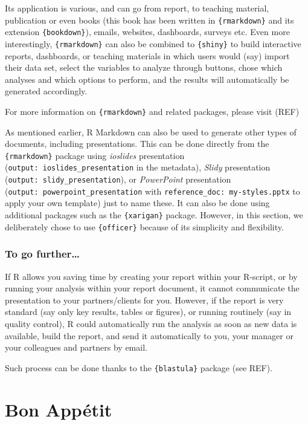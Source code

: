\documentclass[
]{book}
\begin{document}
Its application is various, and can go from report, to teaching material, publication or even books (this book has been written in \texttt{\{rmarkdown\}} and its extension \texttt{\{bookdown\}}), emails, websites, dashboards, surveys etc. Even more interestingly, \texttt{\{rmarkdown\}} can also be combined to \texttt{\{shiny\}} to build interactive reports, dashboards, or teaching materials in which users would (say) import their data set, select the variables to analyze through buttons, chose which analyses and which options to perform, and the results will automatically be generated accordingly.

For more information on \texttt{\{rmarkdown\}} and related packages, please visit (REF)

As mentioned earlier, R Markdown can also be used to generate other types of documents, including presentations. This can be done directly from the \texttt{\{rmarkdown\}} package using \emph{ioslides} presentation (\texttt{output:\ ioslides\_presentation} in the metadata), \emph{Slidy} presentation (\texttt{output:\ slidy\_presentation}), or \emph{PowerPoint} presentation (\texttt{output:\ powerpoint\_presentation} with \texttt{reference\_doc:\ my-styles.pptx} to apply your own template) just to name these. It can also be done using additional packages such as the \texttt{\{xarigan\}} package. However, in this section, we deliberately chose to use \texttt{\{officer\}} because of its simplicity and flexibility.

\hypertarget{to-go-further}{%
\section{To go further\ldots{}}\label{to-go-further}}

If R allows you saving time by creating your report within your R-script, or by running your analysis within your report document, it cannot communicate the presentation to your partners/clients for you. However, if the report is very standard (say only key results, tables or figures), or running routinely (say in quality control), R could automatically run the analysis as soon as new data is available, build the report, and send it automatically to you, your manager or your colleagues and partners by email.

Such process can be done thanks to the \texttt{\{blastula\}} package (see REF).

\hypertarget{part-bon-appuxe9tit}{%
\part*{Bon Appétit}\label{part-bon-appuxe9tit}}
\end{document}
